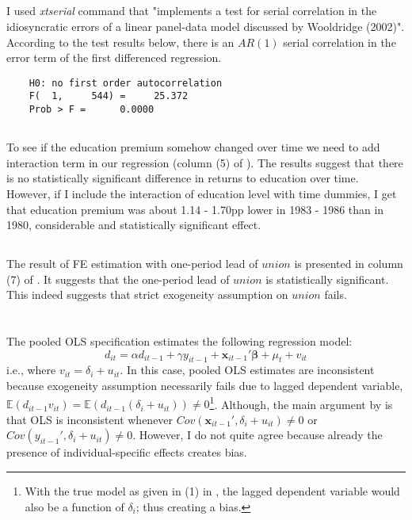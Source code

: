 \documentclass[]{article}
\begin{document}
\subsection{}
I used \textit{xtserial} command that "implements a test for serial correlation in the idiosyncratic errors of a linear panel-data model discussed by Wooldridge (2002)". According to the test results below, there is an $AR(1)$ serial correlation in the error term of the first differenced regression.
\begin{verbatim}
	H0: no first order autocorrelation
	F(  1,     544) =     25.372
	Prob > F =      0.0000
\end{verbatim}

\subsection{}
To see if the education premium somehow changed over time we need to add interaction term in our regression (column (5) of ). The results suggest that there is no statistically significant difference in returns to education over time. However, if I include the interaction of education level with time dummies, I get that education premium was about 1.14 - 1.70pp lower in 1983 - 1986 than in 1980, considerable and statistically significant effect.

\subsection{}
The result of FE estimation with one-period lead of $union$ is presented in column (7) of . It suggests that the one-period lead of $union$ is statistically significant. This indeed suggests that strict exogeneity assumption on $union$ fails.

\section{}
\subsection{}
The pooled OLS specification estimates the following regression model:
\begin{equation}
	d_{it} = \alpha d_{it-1} + \gamma y_{it-1} + \mathbf{x}_{it-1}'\mathbf{\beta} + \mu_t + v_{it} \nonumber
\end{equation}
i.e., where $v_{it} = \delta_i + u_{it}$. In this case, pooled OLS estimates are inconsistent because exogeneity assumption necessarily fails due to lagged dependent variable, $\mathbb{E}(d_{it-1}v_{it}) = \mathbb{E}(d_{it-1}(\delta_i + u_{it})) \neq 0$\footnote{With the true model as given in (1) in \textcite{AJRY_2008}, the lagged dependent variable would also be a function of $\delta_i$; thus creating a bias.}. Although, the main argument by \textcite{AJRY_2008} is that OLS is inconsistent whenever $Cov(\mathbf{x}_{it-1}', \delta_i + u_{it})\neq 0$ or $Cov(y_{it-1}', \delta_i + u_{it})\neq 0$. However, I do not quite agree because already the presence of individual-specific effects creates bias.
\end{document}
